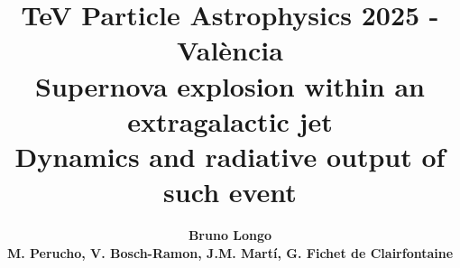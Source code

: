 \documentclass[unknownkeysallowed,table]{beamer}
\title[]{{\small TeV Particle Astrophysics 2025 - València}\vspace{.5cm} \\
\bf{Supernova explosion within an extragalactic jet\\Dynamics and radiative output of such event}}
\author[]{\large \bf{ Bruno Longo} \\
{\scriptsize M. Perucho, V. Bosch-Ramon, J.M. Mart\'i, G. Fichet de Clairfontaine}}
\institute[]{Departament d'Astronomia i Astrof\'isica, Universitat de València }
\begin{document}
\begin{frame}[plain]
\maketitle
\end{frame}




\end{document}
